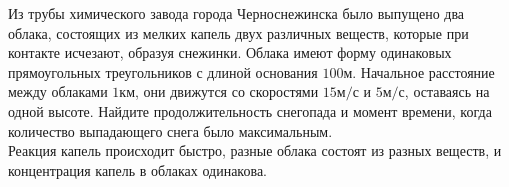 Из трубы химического завода города Черноснежинска было выпущено два облака, состоящих из мелких капель двух различных веществ, которые при контакте исчезают, образуя снежинки. Облака имеют форму одинаковых прямоугольных треугольников с длиной основания $100\unit{м}$. Начальное расстояние между облаками $1\unit{км}$, они движутся со скоростями $15\unit{м/с}$ и $5\unit{м/с}$, оставаясь на одной высоте. Найдите продолжительность снегопада и момент времени, когда количество выпадающего снега было максимальным. \\
Реакция капель происходит быстро, разные облака состоят из разных веществ, и концентрация капель в облаках одинакова.